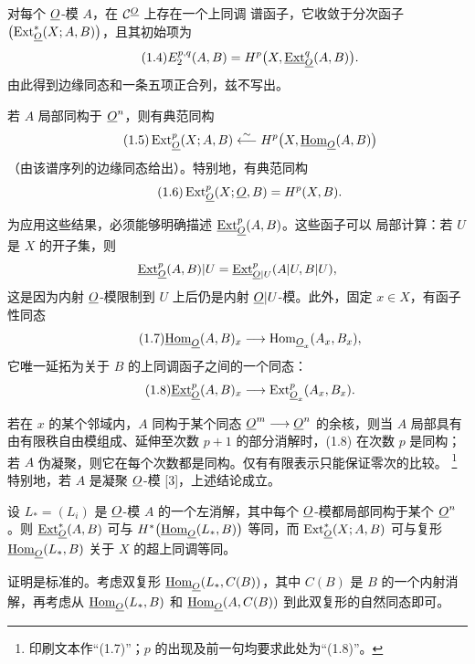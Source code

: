  对每个 $\underline{O}$-模 $A$，在 $\mathcal C^{\underline{O}}$ 上存在一个上同调
谱函子，它收敛于分次函子
$\bigl(\operatorname{Ext}_{\underline{O}}^{*}(X;A,B)\bigr)$，且其初始项为
\begin{equation}\tag{1.4}
  E_{2}^{p,q}(A,B)=H^{p}\bigl(X,\underline{\operatorname{Ext}}_{\underline{O}}^{q}(A,B)\bigr).
\end{equation}
由此得到边缘同态和一条五项正合列，兹不写出。

 若 $A$ 局部同构于 $\underline{O}^{n}$，则有典范同构
\begin{equation}\tag{1.5}
  \operatorname{Ext}_{\underline{O}}^{p}(X;A,B)
  \overset{\sim}{\longleftarrow}
  H^{p}\bigl(X,\underline{\operatorname{Hom}}_{\underline{O}}(A,B)\bigr)
\end{equation}
（由该谱序列的边缘同态给出）。特别地，有典范同构
\begin{equation}\tag{1.6}
  \operatorname{Ext}_{\underline{O}}^{p}(X;\underline{O},B)=H^{p}(X,B).
\end{equation}

为应用这些结果，必须能够明确描述 $\underline{\operatorname{Ext}}_{\underline{O}}^{p}(A,B)$。这些函子可以
局部计算：若 $U$ 是 $X$ 的开子集，则
\[
  \underline{\operatorname{Ext}}_{\underline{O}}^{p}(A,B)|U
  =\underline{\operatorname{Ext}}_{\underline{O}|U}^{p}(A|U,B|U),
\]
这是因为内射 $\underline{O}$-模限制到 $U$ 上后仍是内射 $\underline{O}|U$-模。此外，固定
$x\in X$，有函子性同态
\begin{equation}\tag{1.7}
  \underline{\operatorname{Hom}}_{\underline{O}}(A,B)_x
  \longrightarrow
  \operatorname{Hom}_{\underline{O}_x}(A_x,B_x),
\end{equation}
它唯一延拓为关于 $B$ 的上同调函子之间的一个同态：
\begin{equation}\tag{1.8}
  \underline{\operatorname{Ext}}_{\underline{O}}^{p}(A,B)_x
  \longrightarrow
  \operatorname{Ext}_{\underline{O}_x}^{p}(A_x,B_x).
\end{equation}

 若在 $x$ 的某个邻域内，$A$ 同构于某个同态
$\underline{O}^{m}\longrightarrow\underline{O}^{n}$ 的余核，则当 $A$ 局部具有由有限秩自由模组成、延伸至次数 $p+1$ 的部分消解时，(1.8) 在次数 $p$ 是同构；若 $A$ 伪凝聚，则它在每个次数都是同构。仅有有限表示只能保证零次的比较。%
\footnote{印刷文本作“(1.7)”；$p$ 的出现及前一句均要求此处为“(1.8)”。}
特别地，若 $A$ 是凝聚 $\underline{O}$-模 [3]，上述结论成立。

 设 $L_{*}=(L_i)$ 是 $\underline{O}$-模 $A$ 的一个左消解，其中每个
$\underline{O}$-模都局部同构于某个 $\underline{O}^{n}$。则 $\underline{\operatorname{Ext}}_{\underline{O}}^{*}(A,B)$ 可与
$H^{*}\bigl(\underline{\operatorname{Hom}}_{\underline{O}}(L_{*},B)\bigr)$ 等同，而
$\operatorname{Ext}_{\underline{O}}^{*}(X;A,B)$ 可与复形
$\underline{\operatorname{Hom}}_{\underline{O}}(L_{*},B)$ 关于 $X$ 的超上同调等同。

证明是标准的。考虑双复形 $\underline{\operatorname{Hom}}_{\underline{O}}(L_{*},C(B))$，其中 $C(B)$ 是 $B$
的一个内射消解，再考虑从 $\underline{\operatorname{Hom}}_{\underline{O}}(L_{*},B)$ 和
$\underline{\operatorname{Hom}}_{\underline{O}}(A,C(B))$ 到此双复形的自然同态即可。

